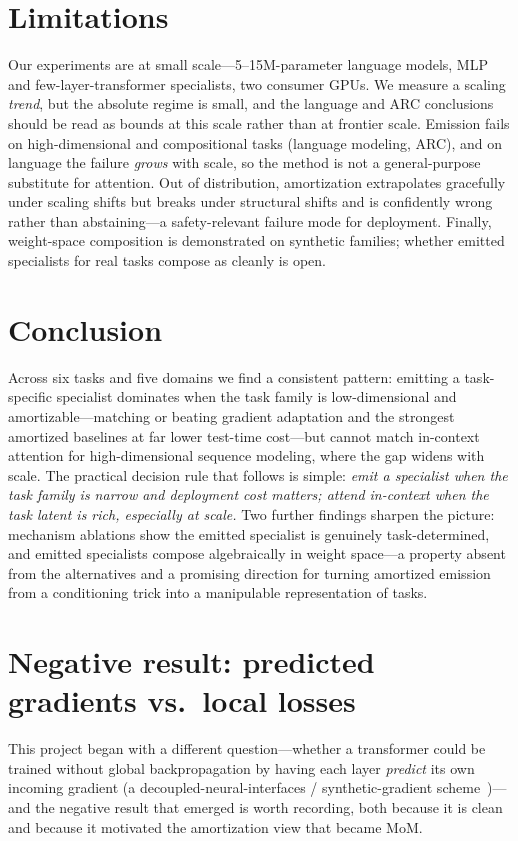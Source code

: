 \documentclass[11pt]{article}
\begin{document}
\section{Limitations}
Our experiments are at small scale---5--15M-parameter language models, MLP and
few-layer-transformer specialists, two consumer GPUs. We measure a scaling
\emph{trend}, but the absolute regime is small, and the language and ARC conclusions
should be read as bounds at this scale rather than at frontier scale. Emission fails
on high-dimensional and compositional tasks (language modeling, ARC), and on language
the failure \emph{grows} with scale, so the method is not a general-purpose substitute
for attention. Out of distribution, amortization extrapolates gracefully under
scaling shifts but breaks under structural shifts and is confidently wrong rather than
abstaining---a safety-relevant failure mode for deployment. Finally, weight-space
composition is demonstrated on synthetic families; whether emitted specialists for
real tasks compose as cleanly is open.

\section{Conclusion}
Across six tasks and five domains we find a consistent pattern: emitting a
task-specific specialist dominates when the task family is low-dimensional and
amortizable---matching or beating gradient adaptation and the strongest amortized
baselines at far lower test-time cost---but cannot match in-context attention for
high-dimensional sequence modeling, where the gap widens with scale. The practical
decision rule that follows is simple: \emph{emit a specialist when the task family is
narrow and deployment cost matters; attend in-context when the task latent is rich,
especially at scale.} Two further findings sharpen the picture: mechanism ablations
show the emitted specialist is genuinely task-determined, and emitted specialists
compose algebraically in weight space---a property absent from the alternatives and a
promising direction for turning amortized emission from a conditioning trick into a
manipulable representation of tasks.

\appendix
\section{Negative result: predicted gradients vs.\ local losses}
\label{app:negative}
This project began with a different question---whether a transformer could be trained
without global backpropagation by having each layer \emph{predict} its own incoming
gradient (a decoupled-neural-interfaces / synthetic-gradient
scheme~\citep{jaderberg2017dni})---and the negative result that emerged is worth
recording, both because it is clean and because it motivated the amortization view
that became MoM.
\end{document}

